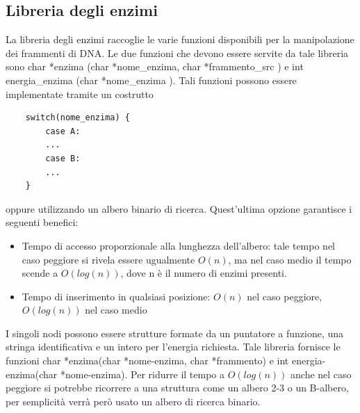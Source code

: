 \documentclass[a4paper,10pt]{article}
\begin{document}
\subsection{Libreria degli enzimi}
La libreria degli enzimi raccoglie le varie funzioni disponibili per la manipolazione dei frammenti di DNA.
Le due funzioni che devono essere servite da tale libreria sono char *enzima (char *nome\_{}enzima, char *frammento\_{}src ) e int energia\_{}enzima (char *nome\_{}enzima ).
Tali funzioni possono essere implementate tramite un costrutto \begin{verbatim}
    switch(nome_enzima) {
        case A:
        ...
        case B:
        ...
    }
\end{verbatim} oppure utilizzando un albero binario di ricerca. Quest'ultima opzione garantisce i seguenti benefici:
\begin{itemize}
\item Tempo di accesso proporzionale alla lunghezza dell'albero: tale tempo nel caso peggiore si rivela essere ugualmente $O(n)$, ma nel caso medio il tempo scende a $O(log(n))$, dove n è il numero di enzimi presenti.
\item Tempo di inserimento in qualsiasi posizione: $O(n)$ nel caso peggiore, $O(log(n))$ nel caso medio
\end{itemize} I singoli nodi possono essere strutture formate da un puntatore a funzione, una stringa identificativa e un intero per l'energia richiesta. Tale libreria fornisce le funzioni char *enzima(char *nome-enzima, char *frammento) e int energia-enzima(char *nome-enzima).
Per ridurre il tempo a $O(log(n))$ anche nel caso peggiore si potrebbe ricorrere a una struttura come un albero 2-3 o un B-albero, per semplicità verrà però usato un albero di ricerca binario.
\end{document}
